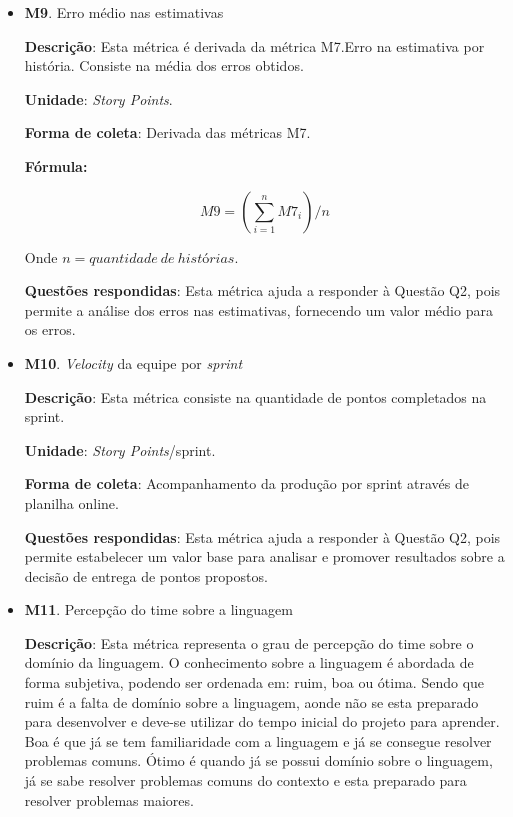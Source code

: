\begin{itemize}
	 \item \textbf{M9}. Erro médio nas estimativas

	   \subitem \textbf{Descrição}: Esta métrica é derivada da métrica M7.Erro na estimativa por história.
		    Consiste na média dos erros obtidos.

	   \subitem \textbf{Unidade}: \textit{Story Points}.

	   \subitem \textbf{Forma de coleta}: Derivada das métricas M7.

	      \subsubitem \textbf{Fórmula:}

		$$ M9 = (\sum\limits_{i=1}^{n}M7_i)/n $$

	      \subsubitem Onde $n = quantidade\ de\ histórias$.

	   \subitem \textbf{Questões respondidas}: Esta métrica ajuda a responder à Questão Q2, pois permite a análise
		    dos erros nas estimativas, fornecendo um valor médio para os erros.

	 \item \textbf{M10}. \textit{Velocity} da equipe por \textit{sprint}
	   
	   \subitem \textbf{Descrição}: Esta métrica consiste na quantidade de pontos completados na sprint.
	   
	   \subitem \textbf{Unidade}: \textit{Story Points}/sprint.
	   
	   \subitem \textbf{Forma de coleta}: Acompanhamento da produção por sprint através de planilha online.
	   
	   \subitem \textbf{Questões respondidas}: Esta métrica ajuda a responder à Questão Q2, pois permite estabelecer um valor base para analisar e promover resultados sobre a decisão de entrega de pontos propostos. 
	 
	 \item \textbf{M11}. Percepção do time sobre a linguagem
	 
	 	\subitem \textbf{Descrição}: Esta métrica representa o grau de percepção do time sobre o domínio da
	 	 linguagem. O conhecimento sobre a linguagem é abordada de forma subjetiva, podendo ser ordenada em: ruim,
	 	  boa ou ótima. Sendo que ruim é a falta de domínio sobre a linguagem, aonde não se esta preparado para
	 	   desenvolver e deve-se utilizar do tempo inicial do projeto para aprender. Boa é que já se tem
	 	    familiaridade com a linguagem e já se consegue resolver problemas comuns. Ótimo é quando já se possui 
	 	    domínio sobre o linguagem, já se sabe resolver problemas comuns do contexto e esta preparado para 
	 	    resolver problemas maiores.
	   

\end{itemize}
